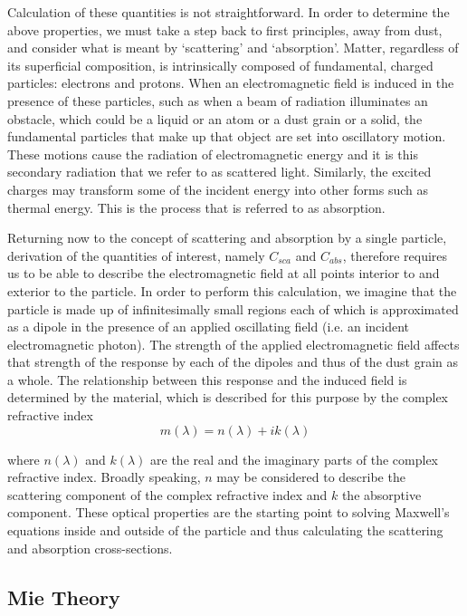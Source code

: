 Calculation of these quantities is not straightforward.  In order to determine the above properties, we must take a step back to first principles, away from dust, and consider what is meant by `scattering' and `absorption'.  Matter, regardless of its superficial composition, is intrinsically composed of fundamental, charged particles: electrons and protons.  When an electromagnetic field is induced in the presence of these particles, such as when a beam of radiation illuminates an obstacle, which could be a liquid or an atom or a dust grain or a solid, the fundamental particles that make up that object are set into oscillatory motion.  These motions cause the radiation of electromagnetic energy and it is this secondary radiation that we refer to as scattered light.  Similarly, the excited charges may transform some of the incident energy into other forms such as thermal energy.  This is the process that is referred to as absorption.

Returning now to the concept of scattering and absorption by a single particle, derivation of the quantities of interest, namely $C_{sca}$ and $C_{abs}$, therefore requires us to be able to describe the electromagnetic field at all points interior to and exterior to the particle.  In order to perform this calculation, we imagine that the particle is made up of infinitesimally small regions each of which is approximated as a dipole in the presence of an applied oscillating field (i.e. an incident electromagnetic photon).  The strength of the applied electromagnetic field affects that strength of the response by each of the dipoles and thus of the dust grain as a whole.  The relationship between this response and the induced field is determined by the material, which is described for this purpose by the complex refractive index 
\begin{equation}
m(\lambda)=n(\lambda)+ik(\lambda)
\end{equation}

\noindent where $n(\lambda)$ and $k(\lambda)$ are the real and the imaginary parts of the complex refractive index.  Broadly speaking, $n$ may be considered to describe the scattering component of the complex refractive index and $k$ the absorptive component.  These optical properties are the starting point to solving Maxwell's equations inside and outside of the particle and thus calculating the scattering and absorption cross-sections.

\subsection{Mie Theory}
\label{scn:mie_theory}

